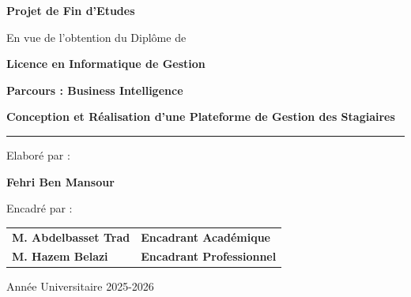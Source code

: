 \documentclass[a4paper, oneside, 12pt, final]{extreport}
\begin{document}
\begin{center}
    \vspace{1cm}
    {\Huge\bfseries Projet de Fin d'Etudes \par}
    \vspace{0.5cm} 

    {\large En vue de l'obtention du Diplôme de \par}
    \vspace{0.5cm} 

    {\LARGE\bfseries Licence en Informatique de Gestion \par}
    \vspace{0.5cm} 

    {\LARGE\bfseries Parcours : Business Intelligence \par}
    \vspace{1.5cm} 

    {\Huge\bfseries Conception et Réalisation d'une Plateforme de Gestion des Stagiaires \par}
    \vspace{1cm} 

    \rule{\linewidth}{3pt}
    \vspace{0.5cm} 

    {\Large Elaboré par : \par}
    \vspace{0.5cm} 
    {\LARGE\bfseries Fehri Ben Mansour \par}
    \vspace{1cm} 

    {\Large Encadré par : \par}
    \vspace{0.5cm} 
\end{center}

\begin{center}
\begin{tabular}{ l l }
\large\bfseries M. Abdelbasset Trad & \large\bfseries Encadrant Académique \\
\large\bfseries M. Hazem Belazi & \large\bfseries Encadrant Professionnel \\
\end{tabular}
\end{center}

\vfill 
\begin{center}
    \vspace{1.5cm}
    {\large Année Universitaire 2025-2026 \par}
\end{center}
\end{document}
